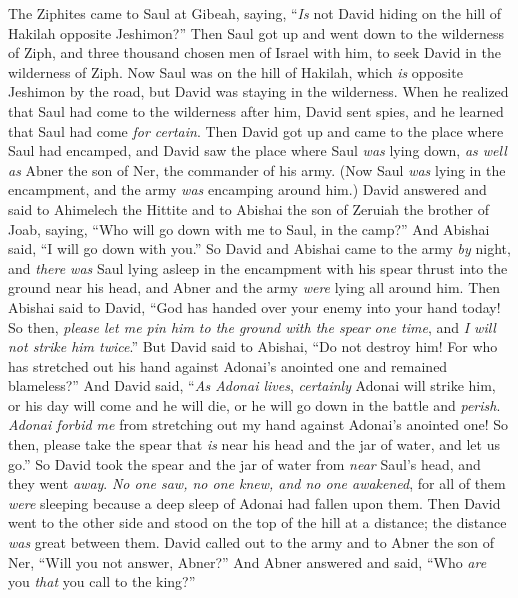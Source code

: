 \begin{biblechapter} %
 The Ziphites came to Saul at Gibeah, saying, “\textit{Is} not David hiding on the hill of Hakilah opposite Jeshimon?”
\verse Then Saul got up and went down to the wilderness of Ziph, and three thousand chosen men of Israel with him, to seek David in the wilderness of Ziph.
\verse Now Saul was on the hill of Hakilah, which \textit{is} opposite Jeshimon by the road, but David was staying in the wilderness. When he realized that Saul had come to the wilderness after him,
\verse David sent spies, and he learned that Saul had come \textit{for certain}.
\verse Then David got up and came to the place where Saul had encamped, and David saw the place where Saul \textit{was} lying down, \textit{as well as} Abner the son of Ner, the commander of his army. (Now Saul \textit{was} lying in the encampment, and the army \textit{was} encamping around him.)
\verse David answered and said to Ahimelech the Hittite and to Abishai the son of Zeruiah the brother of Joab, saying, “Who will go down with me to Saul, in the camp?” And Abishai said, “I will go down with you.”
\verse So David and Abishai came to the army \textit{by} night, and \textit{there was} Saul lying asleep in the encampment with his spear thrust into the ground near his head, and Abner and the army \textit{were} lying all around him.
\verse Then Abishai said to David, “God has handed over your enemy into your hand today! So then, \textit{please let me pin him to the ground with the spear} \textit{one time}, and \textit{I will not strike him twice}.”
\verse But David said to Abishai, “Do not destroy him! For who has stretched out his hand against Adonai’s anointed one and remained blameless?”
\verse And David said, “\textit{As Adonai lives}, \textit{certainly} Adonai will strike him, or his day will come and he will die, or he will go down in the battle and \textit{perish}.
\verse \textit{Adonai forbid me} from stretching out my hand against Adonai’s anointed one! So then, please take the spear that \textit{is} near his head and the jar of water, and let us go.”
\verse So David took the spear and the jar of water from \textit{near} Saul’s head, and they went \textit{away}. \textit{No one saw, no one knew, and no one awakened}, for all of them \textit{were} sleeping because a deep sleep of Adonai had fallen upon them.
\verse Then David went to the other side and stood on the top of the hill at a distance; the distance \textit{was} great between them.
\verse David called out to the army and to Abner the son of Ner, “Will you not answer, Abner?” And Abner answered and said, “Who \textit{are} you \textit{that} you call to the king?”

\end{biblechapter}
